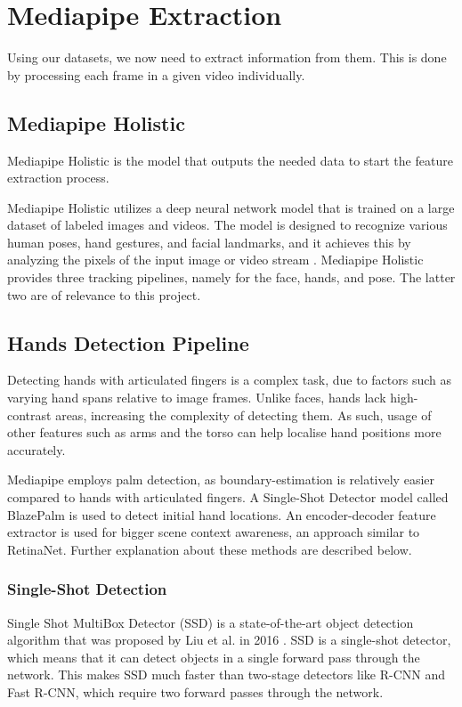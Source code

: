 \documentclass[final,rdr32.tex]{subfiles}
\begin{document}
\section{Mediapipe Extraction}
\label{sec:mediapipe}

Using our datasets, we now need to extract information from them. This is done by processing each frame in a given video individually.

\subsection{Mediapipe Holistic}

Mediapipe Holistic is the model that outputs the needed data to start the feature extraction process.

Mediapipe Holistic utilizes a deep neural network model that is trained on a large dataset of labeled images and videos. The model is designed to recognize various human poses, hand gestures, and facial landmarks, and it achieves this by analyzing the pixels of the input image or video stream \cite{grishchenko_bazarevsky_2020}. Mediapipe Holistic provides three tracking pipelines, namely for the face, hands, and pose. The latter two are of relevance to this project.

\subsection{Hands Detection Pipeline}

Detecting hands with articulated fingers is a complex task, due to factors such as varying hand spans relative to image frames. Unlike faces, hands lack high-contrast areas, increasing the complexity of detecting them. As such, usage of other features such as arms and the torso can help localise hand positions more accurately.

Mediapipe employs palm detection, as boundary-estimation is relatively easier compared to hands with articulated fingers. A Single-Shot Detector model called BlazePalm is used to detect initial hand locations. An encoder-decoder feature extractor is used for bigger scene context awareness, an approach similar to RetinaNet. Further explanation about these methods are described below.

\subsubsection{Single-Shot Detection}

Single Shot MultiBox Detector (SSD) is a state-of-the-art object detection algorithm that was proposed by Liu et al. in 2016 \cite{liu2016ssd}. SSD is a single-shot detector, which means that it can detect objects in a single forward pass through the network. This makes SSD much faster than two-stage detectors like R-CNN and Fast R-CNN, which require two forward passes through the network.
\end{document}
